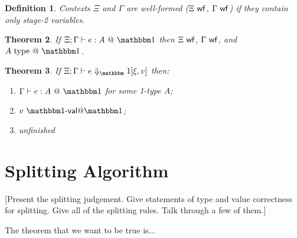 \documentclass{sigplanconf}
\newtheorem{theorem}{Theorem}[section]
\newtheorem{definition}[theorem]{Definition}
\begin{document}
\begin{definition}
Contexts $\Xi$ and $\Gamma$ are well-formed ($\Xi\ \mathsf{wf}$, $\Gamma\ \mathsf{wf}$) if they
contain only stage-2 variables.
\end{definition}

\begin{theorem}
If $\Xi;\typesone e A$ then $\Xi\ \mathsf{wf}$, $\Gamma\ \mathsf{wf}$, and $A\istypeone$.
\end{theorem}

\begin{theorem}
If $\Xi;\Gamma\vdash\diaonesub$ then:
\begin{enumerate}
\item $\typesone e A$ for some 1-type $A$;
\item $v\valoo$;
\item \TODO unfinished
\end{enumerate}
\end{theorem}

\section{Splitting Algorithm}

[Present the splitting judgement.  Give statements of type and value correctness for splitting.  Give all of the splitting rules.  Talk through a few of them.]

The theorem that we want to be true is...

\end{document}
